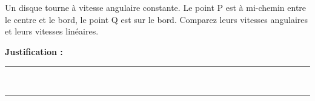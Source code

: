 Un disque tourne à vitesse angulaire constante. Le point P est à mi-chemin entre le centre et le bord, le point Q est sur le bord. Comparez leurs vitesses angulaires et leurs vitesses linéaires.

\choices

\noindent\textbf{Justification :} \hrulefill \\[2.5ex]
\rule{\linewidth}{0.4pt} \\[2.5ex]
\rule{\linewidth}{0.4pt}
\vfill

